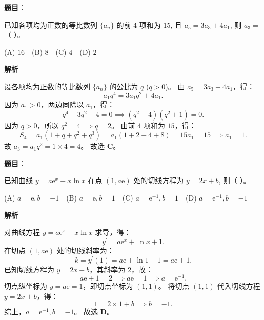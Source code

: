 \begin{answer}

\textbf{题目}：

已知各项均为正数的等比数列 $\{a_n\}$ 的前 4 项和为 15, 且 $a_5 = 3a_3 + 4a_1$, 则 $a_3 =$（ ）。

(A) $16$　(B) $8$　(C) $4$　(D) $2$

\textbf{解析}

设各项均为正数的等比数列 $\{a_n\}$ 的公比为 $q$ ($q > 0$)。
由 $a_5 = 3a_3 + 4a_1$，得：
\nopagebreak[4]
\[a_1 q^4 = 3a_1 q^2 + 4a_1.\]
因为 $a_1 > 0$，两边同除以 $a_1$，得：
\nopagebreak[4]
\[q^4 - 3q^2 - 4 = 0 \implies (q^2 - 4)(q^2 + 1) = 0.\]
因为 $q > 0$，所以 $q^2 = 4 \implies q = 2$。
由前 4 项和为 $15$，得：
\nopagebreak[4]
\[S_4 = a_1(1 + q + q^2 + q^3) = a_1(1 + 2 + 4 + 8) = 15a_1 = 15 \implies a_1 = 1.\]
故 $a_3 = a_1 q^2 = 1 \times 4 = 4$。
故选 \textbf{C}。


\end{answer}
\begin{answer}

\textbf{题目}：

已知曲线 $y = a\mathrm{e}^x + x \ln x$ 在点 $(1, a\mathrm{e})$ 处的切线方程为 $y = 2x + b$, 则（ ）。

(A) $a = \mathrm{e}, b = -1$　(B) $a = \mathrm{e}, b = 1$　(C) $a = \mathrm{e}^{-1}, b = 1$　(D) $a = \mathrm{e}^{-1}, b = -1$

\textbf{解析}

对曲线方程 $y = a\mathrm{e}^x + x \ln x$ 求导，得：
\nopagebreak[4]
\[y^\prime = a\mathrm{e}^x + \ln x + 1.\]
在切点 $(1, a\mathrm{e})$ 处的切线斜率为：
\nopagebreak[4]
\[k = y^\prime(1) = a\mathrm{e} + \ln 1 + 1 = a\mathrm{e} + 1.\]
已知切线方程为 $y = 2x + b$，其斜率为 $2$，故：
\nopagebreak[4]
\[a\mathrm{e} + 1 = 2 \implies a\mathrm{e} = 1 \implies a = \mathrm{e}^{-1}.\]
切点纵坐标为 $y = a\mathrm{e} = 1$，即切点坐标为 $(1, 1)$。
将切点 $(1, 1)$ 代入切线方程 $y = 2x + b$，得：
\nopagebreak[4]
\[1 = 2 \times 1 + b \implies b = -1.\]
综上，$a = \mathrm{e}^{-1}, b = -1$。
故选 \textbf{D}。


\end{answer}

